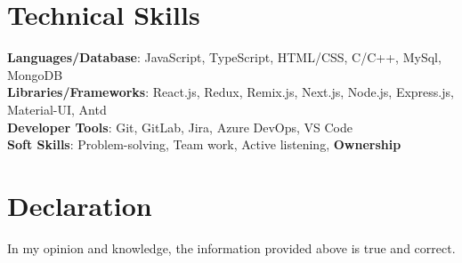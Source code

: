 \documentclass[letterpaper,11pt]{article}
\begin{document}
\section{Technical Skills}
 \begin{itemize}[leftmargin=0.15in, label={}]
    \small{\item{
     \textbf{Languages/Database}{: JavaScript, TypeScript, HTML/CSS, C/C++, MySql, MongoDB} \\ \vspace{1.5pt}
     \textbf{Libraries/Frameworks}{: React.js, Redux, Remix.js, Next.js, Node.js, Express.js, Material-UI, Antd} \\ \vspace{1.5pt}
     \textbf{Developer Tools}{: Git, GitLab, Jira, Azure DevOps, VS Code} \\ \vspace{1.5pt}
     \textbf{Soft Skills}{: Problem-solving, Team work, Active listening, \textbf{Ownership}}
    }}
 \end{itemize}


\section{Declaration}
 \begin{itemize}[leftmargin=0.15in, label={}]
    \small{\item{
     In my opinion and knowledge, the information provided above is true and correct.
    }}
 \end{itemize}


\end{document}
